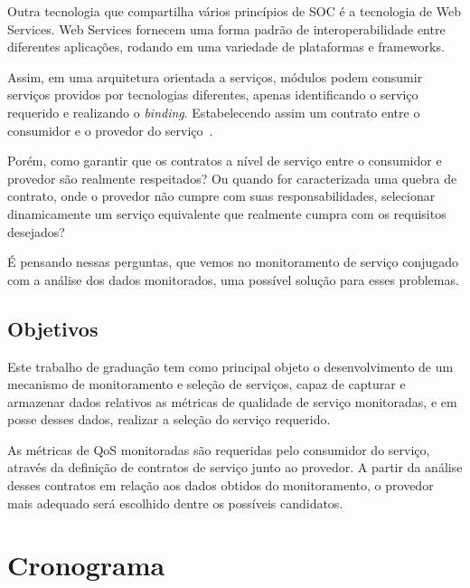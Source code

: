 Outra tecnologia que compartilha vários princípios de SOC é a tecnologia de Web Services. Web Services fornecem uma forma padrão de interoperabilidade entre diferentes aplicações, rodando em uma variedade de plataformas e frameworks.~\cite{w3c2002ws}


Assim, em uma arquitetura orientada a serviços, módulos podem consumir serviços providos por tecnologias diferentes, apenas identificando o serviço requerido e realizando o \textit{binding}. Estabelecendo assim um contrato entre o consumidor e o provedor do serviço~\cite{oracle2005ws}.  

Porém, como garantir que os contratos a nível de serviço entre o consumidor e provedor são realmente respeitados? Ou quando for caracterizada uma quebra de contrato, onde o provedor não cumpre com suas responsabilidades, selecionar dinamicamente um serviço equivalente que realmente cumpra com os requisitos desejados?

É pensando nessas perguntas, que vemos no monitoramento de serviço conjugado com a análise dos dados monitorados, uma possível solução para esses problemas.

\newpage
\section{Objetivos}
\label{pr:objectives}

Este trabalho de graduação tem como principal objeto o desenvolvimento de um mecanismo de monitoramento e seleção de serviços, capaz de capturar e armazenar dados relativos as métricas de qualidade de serviço monitoradas, e em posse desses dados, realizar a seleção do serviço requerido.

As métricas de QoS monitoradas são requeridas pelo consumidor do serviço, através da definição de contratos de serviço junto ao provedor. A partir da análise desses contratos em relação aos dados obtidos do monitoramento, o provedor mais adequado será escolhido dentre os possíveis candidatos.

\newpage
\chapter{Cronograma}
\label{pr:chrono}

